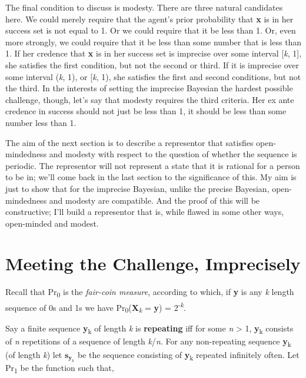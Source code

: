 \documentclass[
  11pt,
  letterpaper,
  DIV=11,
  numbers=noendperiod,
  twoside]{scrartcl}
\begin{document}
The final condition to discuss is modesty. There are three natural
candidates here. We could merely require that the agent's prior
probability that \textbf{x} is in her success set is not equal to 1. Or
we could require that it be less than 1. Or, even more strongly, we
could require that it be less than some number that is less than 1. If
her credence that \textbf{x} is in her success set is imprecise over
some interval {[}\emph{k}, 1{]}, she satisfies the first condition, but
not the second or third. If it is imprecise over some interval
(\emph{k}, 1), or {[}\emph{k}, 1), she satisfies the first and second
conditions, but not the third. In the interests of setting the imprecise
Bayesian the hardest possible challenge, though, let's say that modesty
requires the third criteria. Her ex ante credence in success should not
just be less than 1, it should be less than some number less than 1.

The aim of the next section is to describe a representor that satisfies
open-mindedness and modesty with respect to the question of whether the
sequence is periodic. The representor will not represent a state that it
is rational for a person to be in; we'll come back in the last section
to the significance of this. My aim is just to show that for the
imprecise Bayesian, unlike the precise Bayesian, open-mindedness and
modesty are compatible. And the proof of this will be constructive; I'll
build a representor that is, while flawed in some other ways,
open-minded and modest.

\section{Meeting the Challenge,
Imprecisely}\label{meeting-the-challenge-imprecisely}

Recall that Pr\textsubscript{0} is the \emph{fair-coin measure},
according to which, if \textbf{y} is any \emph{k} length sequence of 0s
and 1s we have Pr\textsubscript{0}(\textbf{X}\textsubscript{\emph{k}} =
\textbf{y}) = 2\textsuperscript{-\emph{k}}.

Say a finite sequence \textbf{y}\textsubscript{k} of length \emph{k} is
\textbf{repeating} iff for some \emph{n} \textgreater{} 1,
\textbf{y}\textsubscript{k} consists of \emph{n} repetitions of a
sequence of length \emph{k}/\emph{n}. For any non-repeating sequence
\textbf{y}\textsubscript{k} (of length \emph{k}) let
\(\boldsymbol{s}_{\boldsymbol{y}_k}\) be the sequence consisting of
\textbf{y}\textsubscript{k} repeated infinitely often. Let
Pr\textsubscript{1} be the function such that,
\end{document}
